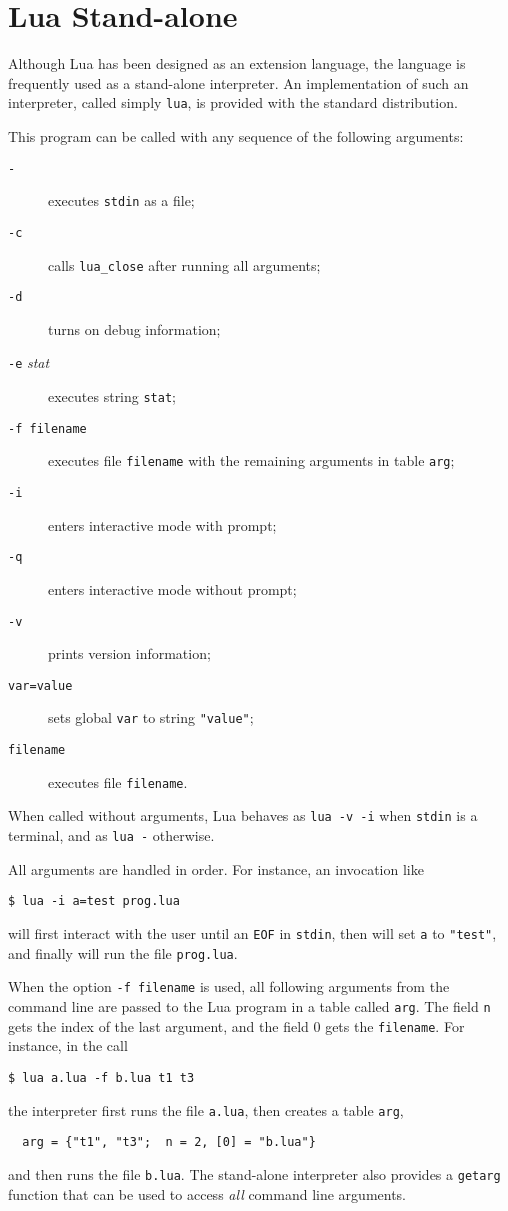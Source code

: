 \documentclass[11pt]{article}
\newcommand{\T}[1]{{\tt #1}}
\newcommand{\Index}[1]{#1\index{#1}}
\begin{document}
\section{\Index{Lua Stand-alone}} \label{lua-sa}

Although Lua has been designed as an extension language,
the language is frequently used as a stand-alone interpreter.
An implementation of such an interpreter,
called simply \verb|lua|,
is provided with the standard distribution.

This program can be called with any sequence of the following arguments:
\begin{description}
\item[\T{-}] executes \verb|stdin| as a file;
\item[\T{-c}] calls \verb|lua_close| after running all arguments;
\item[\T{-d}] turns on debug information;
\item[\T{-e} \rm\emph{stat}] executes string \verb|stat|;
\item[\T{-f filename}] executes file \verb|filename| with the
remaining arguments in table \verb|arg|;
\item[\T{-i}] enters interactive mode with prompt;
\item[\T{-q}] enters interactive mode without prompt;
\item[\T{-v}] prints version information;
\item[\T{var=value}] sets global \verb|var| to string \verb|"value"|;
\item[\T{filename}] executes file \verb|filename|.
\end{description}
When called without arguments,
Lua behaves as \verb|lua -v -i| when \verb|stdin| is a terminal,
and as \verb|lua -| otherwise.

All arguments are handled in order.
For instance, an invocation like
\begin{verbatim}
$ lua -i a=test prog.lua
\end{verbatim}
will first interact with the user until an \verb|EOF| in \verb|stdin|,
then will set \verb|a| to \verb|"test"|,
and finally will run the file \verb|prog.lua|.

When the option \T{-f filename} is used,
all following arguments from the command line
are passed to the Lua program in a table called \verb|arg|.
The field \verb|n| gets the index of the last argument,
and the field 0 gets the \T{filename}.
For instance, in the call
\begin{verbatim}
$ lua a.lua -f b.lua t1 t3
\end{verbatim}
the interpreter first runs the file \T{a.lua},
then creates a table \T{arg},
\begin{verbatim}
  arg = {"t1", "t3";  n = 2, [0] = "b.lua"}
\end{verbatim}
and then runs the file \T{b.lua}.
The stand-alone interpreter also provides a \verb|getarg| function that
can be used to access \emph{all} command line arguments.
\end{document}
